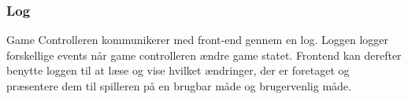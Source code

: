 \subsubsection{Log}
Game Controlleren kommunikerer med front-end gennem en log. Loggen logger forskellige
events når game controlleren ændre game statet. Frontend kan derefter benytte loggen
til at læse og vise hvilket ændringer, der er foretaget og præsentere dem til spilleren
på en brugbar måde og brugervenlig måde.

\newpage
